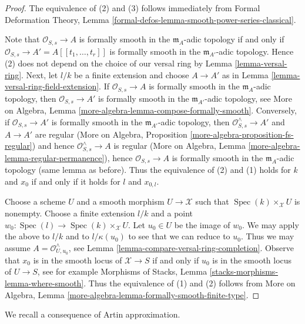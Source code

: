 \documentclass{stacks-project}
\theoremstyle{plain}
\theoremstyle{definition}
\theoremstyle{remark}
\numberwithin{equation}{subsection}
\def\Spec{\mathop{\mathrm{Spec}}}
\begin{document}
\begin{proof}
The equivalence of (2) and (3) follows immediately from
Formal Deformation Theory, Lemma
\ref{formal-defos-lemma-smooth-power-series-classical}.

\medskip\noindent
Note that $\mathcal{O}_{S, s} \to A$ is formally smooth in the
$\mathfrak m_A$-adic topology if and only if
$\mathcal{O}_{S, s} \to A' = A[[t_1, \ldots, t_r]]$
is formally smooth in the $\mathfrak m_{A'}$-adic topology.
Hence (2) does not depend on the choice
of our versal ring by Lemma \ref{lemma-versal-ring}.
Next, let $l/k$ be a finite extension and choose
$A \to A'$ as in Lemma \ref{lemma-versal-ring-field-extension}.
If $\mathcal{O}_{S, s} \to A$ is formally smooth in the
$\mathfrak m_A$-adic topology, then $\mathcal{O}_{S, s} \to A'$
is formally smooth in the $\mathfrak m_{A'}$-adic topology, see
More on Algebra, Lemma \ref{more-algebra-lemma-compose-formally-smooth}.
Conversely, if $\mathcal{O}_{S, s} \to A'$
is formally smooth in the $\mathfrak m_{A'}$-adic topology,
then $\mathcal{O}_{S, s}^\wedge \to A'$ and $A \to A'$ are regular
(More on Algebra, Proposition \ref{more-algebra-proposition-fs-regular})
and hence $\mathcal{O}_{S, s}^\wedge \to A$ is regular
(More on Algebra, Lemma \ref{more-algebra-lemma-regular-permanence}),
hence $\mathcal{O}_{S, s} \to A$ is formally smooth in the
$\mathfrak m_A$-adic topology (same lemma as before).
Thus the equivalence of (2) and (1) holds for
$k$ and $x_0$ if and only if it holds for $l$ and $x_{0, l}$.

\medskip\noindent
Choose a scheme $U$ and a smooth morphism $U \to \mathcal{X}$ such
that $\Spec(k) \times_\mathcal{X} U$ is nonempty. Choose a finite
extension $l/k$ and a point $w_0 : \Spec(l) \to \Spec(k) \times_\mathcal{X} U$.
Let $u_0 \in U$ be the image of $w_0$.
We may apply the above to $l/k$ and to $l/\kappa(u_0)$
to see that we can reduce to $u_0$. Thus we may assume
$A = \mathcal{O}_{U, u_0}^\wedge$, see
Lemma \ref{lemma-compare-versal-ring-completion}.
Observe that $x_0$ is in the smooth locus of $\mathcal{X} \to S$
if and only if $u_0$ is in the smooth locus of $U \to S$, see for example
Morphisms of Stacks, Lemma \ref{stacks-morphisms-lemma-where-smooth}.
Thus the equivalence of (1) and (2) follows from
More on Algebra, Lemma \ref{more-algebra-lemma-formally-smooth-finite-type}.
\end{proof}

\noindent
We recall a consequence of Artin approximation.
\end{document}

